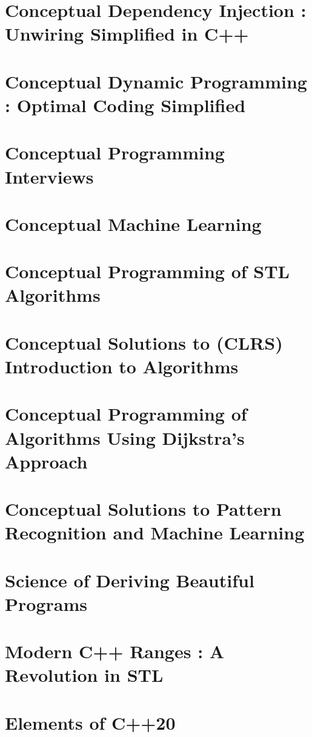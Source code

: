 \documentclass[makeidx, 12pt, oneside, onecolumn, openright, final, svgnames, dvipsnames, extrafontsizes]{memoir}
\theoremstyle{problemstyle}
\begin{document}
\chapter{Conceptual Dependency Injection : Unwiring Simplified in C++}

\chapter{Conceptual Dynamic Programming : Optimal Coding Simplified}

\chapter{Conceptual Programming Interviews}

\chapter{Conceptual Machine Learning}

\chapter{Conceptual Programming of STL Algorithms}

\chapter{Conceptual Solutions to (CLRS) Introduction to Algorithms}

\chapter{Conceptual Programming of Algorithms Using Dijkstra’s Approach}

\chapter{Conceptual Solutions to Pattern Recognition and Machine Learning}

\chapter{Science of Deriving Beautiful Programs}

\chapter{Modern C++ Ranges : A Revolution in STL}

\chapter{Elements of C++20}
\end{document}
